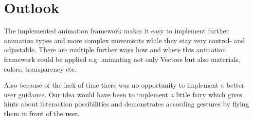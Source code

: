 \section{Outlook}

The implemented animation framework makes it easy to implement further animation types and more complex movements while they stay very control- and adjustable. There are multiple further ways how and where this animation framework could be applied e.g. animating not only Vectors but also materials, colors, transparency etc.

Also because of the lack of time there was no opportunity to implement a better user guidance. Our idea would have been to implement a little fairy which gives hints about interaction possibilities and demonstrates according gestures by flying them in front of the user.